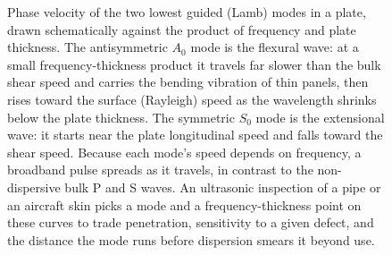 \begin{figure}[htbp]
\centering
{}
\caption[Lamb-wave dispersion in a plate]{Phase velocity of the two
lowest guided (Lamb) modes in a plate, drawn schematically against the
product of frequency and plate thickness. The antisymmetric $A_0$ mode is
the flexural wave: at a small frequency-thickness product it travels far
slower than the bulk shear speed and carries the bending vibration of thin
panels, then rises toward the surface (Rayleigh) speed as the wavelength
shrinks below the plate thickness. The symmetric $S_0$ mode is the
extensional wave: it starts near the plate longitudinal speed and falls
toward the shear speed. Because each mode's speed depends on frequency, a
broadband pulse spreads as it travels, in contrast to the non-dispersive
bulk P and S waves. An ultrasonic inspection of a pipe or an aircraft skin
picks a mode and a frequency-thickness point on these curves to trade
penetration, sensitivity to a given defect, and the distance the mode runs
before dispersion smears it beyond use.}
\label{fig:vol03ch07:lamb-dispersion}
\end{figure}

